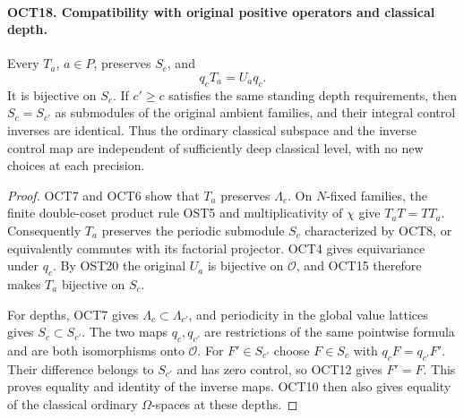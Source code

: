\documentclass[11pt,a4paper]{article}
\numberwithin{equation}{section}
\theoremstyle{remark}\newtheorem{remark}[theorem]{Remark}
\begin{document}
\paragraph{OCT18. Compatibility with original positive operators and classical depth.}
\label{claim:OCT18}
Every $T_a$, $a\in P$, preserves $S_c$, and
\[
                  q_cT_a=U_aq_c.
\]
It is bijective on $S_c$.  If $c'\geq c$ satisfies the same
standing depth requirements, then $S_c=S_{c'}$ as submodules
of the original ambient families, and their integral control
inverses are identical.  Thus the ordinary classical subspace
and the inverse control map are independent of sufficiently
deep classical level, with no new choices at each precision.
\begin{proof}
OCT7 and OCT6 show that $T_a$ preserves $\Lambda_c$.
On $N$-fixed families, the finite double-coset product rule
OST5 and multiplicativity of $\chi$ give
$T_aT=T T_a$.  Consequently $T_a$ preserves the periodic
submodule $S_c$ characterized by OCT8, or equivalently
commutes with its factorial projector.  OCT4 gives
equivariance under $q_c$.  By OST20 the original $U_a$ is
bijective on $\mathcal O$, and OCT15 therefore makes $T_a$
bijective on $S_c$.

For depths, OCT7 gives $\Lambda_c\subset\Lambda_{c'}$,
and periodicity in the global value lattices gives
$S_c\subset S_{c'}$.  The two maps $q_c,\allowbreak{} q_{c'}$ are
restrictions of the same pointwise formula and are both
isomorphisms onto $\mathcal O$.  For $F'\in S_{c'}$ choose
$F\in S_c$ with $q_cF=q_{c'}F'$.  Their difference belongs
to $S_{c'}$ and has zero control, so OCT12 gives $F'=F$.
This proves equality and identity of the inverse maps.
OCT10 then also gives equality of the classical ordinary
$\Omega$-spaces at these depths.
\end{proof}

\end{document}

